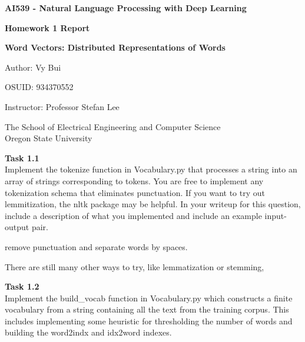 \documentclass[12pt,article]{article}
\newenvironment{task}[2][Task]
    { \begin{mdframed}[backgroundcolor=gray!20] \textbf{#1 #2} \\}
    {  \end{mdframed}}
\begin{document}
\begin{titlepage}
    \begin{center}
        \vspace*{4cm}

        \textbf{\Large AI539 - Natural Language Processing with Deep Learning}

        \vspace{0.5cm}
 
        \textbf{ Homework 1 Report}

        \textbf{ Word Vectors: Distributed Representations of Words}
 
        \vspace{1cm}

        Author: Vy Bui

        OSUID: 934370552

        \vspace{1cm}

        Instructor: Professor Stefan Lee
        \vfill
             
        \vspace{0.8cm}
      
             
        The School of Electrical Engineering and Computer Science\\
        Oregon State University\\
             
    \end{center}
\end{titlepage}

\begin{task}{1.1} 
Implement the tokenize function in Vocabulary.py that processes a string into an array of strings corresponding to tokens. You are free to implement any tokenization schema that eliminates punctuation. If you want to try out lemmitization, the nltk package may be helpful. In your writeup for this question, include a description of what you implemented and include an example input-output pair.
\end{task}

remove punctuation and separate words by spaces.

There are still many other ways to try, like lemmatization or stemming, 

\begin{task}{1.2} 
Implement the build\_vocab function in Vocabulary.py which constructs a finite vocabulary from a string containing all the text from the training corpus. This includes implementing some heuristic for thresholding the number of words and building the word2indx and idx2word indexes.
\end{task}
\end{document}
